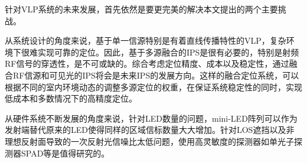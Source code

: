 针对VLP系统的未来发展，首先依然是要更完美的解决本文提出的两个主要挑战。

从系统设计的角度来说，基于单一信源特别是有着直线传播特性的VLP，复杂环境下很难实现可靠的定位。因此，基于多源融合的IPS是很有必要的，特别是射频RF信号的穿透性，是不可或缺的。综合考虑定位精度、成本以及稳定性，通过融合RF信源和可见光的IPS将会是未来IPS的发展方向。这样的融合定位系统，可以根据不同的室内环境动态的调整多源定位的权重，在保证系统稳定性的同时，实现低成本和多数情况下的高精度定位。

从硬件系统不断发展的角度来说，针对LED数量的问题，mini-LED阵列可以作为发射端替代原来的LED使得同样的区域信标数量大大增加。针对LOS遮挡以及非理想反射面导致的一次反射光信噪比太低问题，使用高灵敏度的探测器如单光子探测器SPAD等是值得研究的。


